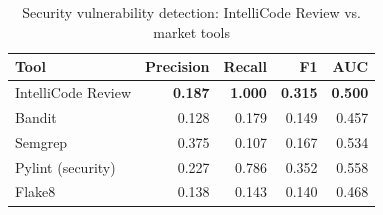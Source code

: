 \begin{table}[H]
\centering
\caption{Security vulnerability detection: IntelliCode Review vs. market tools}
\label{tab:market-security}
\begin{tabular}{@{}lrrrr@{}}
\toprule
\textbf{Tool} & \textbf{Precision} & \textbf{Recall} & \textbf{F1} & \textbf{AUC} \\
\midrule
IntelliCode Review & \textbf{0.187} & \textbf{1.000} & \textbf{0.315} & \textbf{0.500} \\
Bandit & 0.128 & 0.179 & 0.149 & 0.457 \\
Semgrep & 0.375 & 0.107 & 0.167 & 0.534 \\
Pylint (security) & 0.227 & 0.786 & 0.352 & 0.558 \\
Flake8 & 0.138 & 0.143 & 0.140 & 0.468 \\
\bottomrule
\end{tabular}
\end{table}